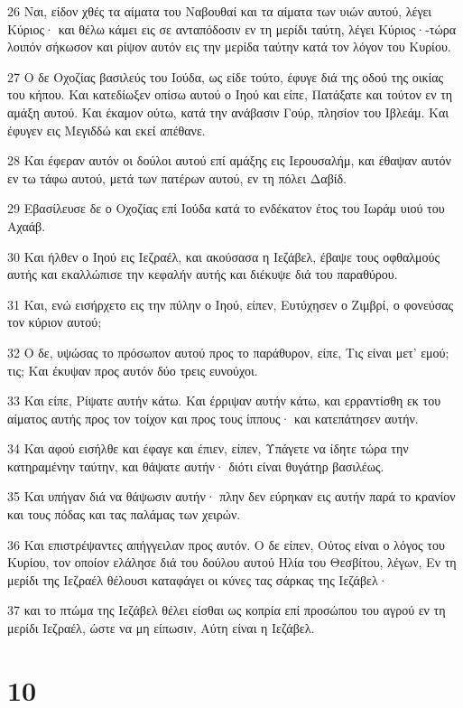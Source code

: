 \par 26 Ναι, είδον χθές τα αίματα του Ναβουθαί και τα αίματα των υιών αυτού, λέγει Κύριος· και θέλω κάμει εις σε ανταπόδοσιν εν τη μερίδι ταύτη, λέγει Κύριος·-τώρα λοιπόν σήκωσον και ρίψον αυτόν εις την μερίδα ταύτην κατά τον λόγον του Κυρίου.
\par 27 Ο δε Οχοζίας βασιλεύς του Ιούδα, ως είδε τούτο, έφυγε διά της οδού της οικίας του κήπου. Και κατεδίωξεν οπίσω αυτού ο Ιηού και είπε, Πατάξατε και τούτον εν τη αμάξη αυτού. Και έκαμον ούτω, κατά την ανάβασιν Γούρ, πλησίον του Ιβλεάμ. Και έφυγεν εις Μεγιδδώ και εκεί απέθανε.
\par 28 Και έφεραν αυτόν οι δούλοι αυτού επί αμάξης εις Ιερουσαλήμ, και έθαψαν αυτόν εν τω τάφω αυτού, μετά των πατέρων αυτού, εν τη πόλει Δαβίδ.
\par 29 Εβασίλευσε δε ο Οχοζίας επί Ιούδα κατά το ενδέκατον έτος του Ιωράμ υιού του Αχαάβ.
\par 30 Και ήλθεν ο Ιηού εις Ιεζραέλ, και ακούσασα η Ιεζάβελ, έβαψε τους οφθαλμούς αυτής και εκαλλώπισε την κεφαλήν αυτής και διέκυψε διά του παραθύρου.
\par 31 Και, ενώ εισήρχετο εις την πύλην ο Ιηού, είπεν, Ευτύχησεν ο Ζιμβρί, ο φονεύσας τον κύριον αυτού;
\par 32 Ο δε, υψώσας το πρόσωπον αυτού προς το παράθυρον, είπε, Τις είναι μετ' εμού; τις; Και έκυψαν προς αυτόν δύο τρεις ευνούχοι.
\par 33 Και είπε, Ρίψατε αυτήν κάτω. Και έρριψαν αυτήν κάτω, και ερραντίσθη εκ του αίματος αυτής προς τον τοίχον και προς τους ίππους· και κατεπάτησεν αυτήν.
\par 34 Και αφού εισήλθε και έφαγε και έπιεν, είπεν, Υπάγετε να ίδητε τώρα την κατηραμένην ταύτην, και θάψατε αυτήν· διότι είναι θυγάτηρ βασιλέως.
\par 35 Και υπήγαν διά να θάψωσιν αυτήν· πλην δεν εύρηκαν εις αυτήν παρά το κρανίον και τους πόδας και τας παλάμας των χειρών.
\par 36 Και επιστρέψαντες απήγγειλαν προς αυτόν. Ο δε είπεν, Ούτος είναι ο λόγος του Κυρίου, τον οποίον ελάλησε διά του δούλου αυτού Ηλία του Θεσβίτου, λέγων, Εν τη μερίδι της Ιεζραέλ θέλουσι καταφάγει οι κύνες τας σάρκας της Ιεζάβελ·
\par 37 και το πτώμα της Ιεζάβελ θέλει είσθαι ως κοπρία επί προσώπου του αγρού εν τη μερίδι Ιεζραέλ, ώστε να μη είπωσιν, Αύτη είναι η Ιεζάβελ.

\chapter{10}

